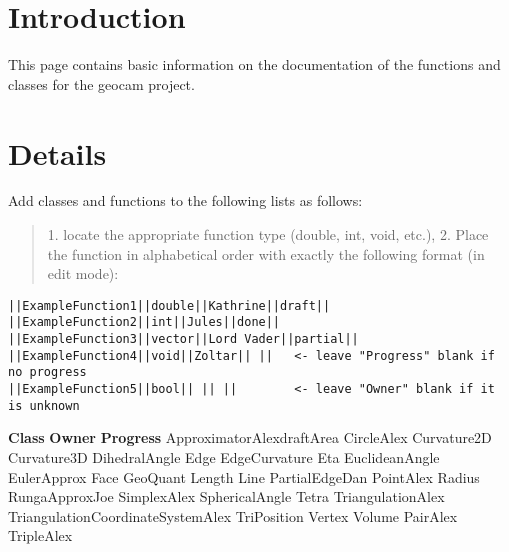 \documentclass[10pt]{article}%
\begin{document}

\section*{Introduction}

\label{f0}This page contains basic information on the documentation of the functions and classes for the geocam project.

\section*{Details}

Add classes and functions to the following lists as follows:
\begin{quotation} 1.  locate the appropriate function type (double, int, void, etc.), 2.  Place the function in alphabetical order with exactly the following format (in edit mode):\end{quotation}{\small{\begin{verbatim} 
||ExampleFunction1||double||Kathrine||draft||
||ExampleFunction2||int||Jules||done||
||ExampleFunction3||vector||Lord Vader||partial||
||ExampleFunction4||void||Zoltar|| ||   <- leave "Progress" blank if no progress
||ExampleFunction5||bool|| || ||        <- leave "Owner" blank if it is unknown
\end{verbatim}
}}
 \textbf{Class}  \textbf{Owner}  \textbf{Progress} ApproximatorAlexdraftArea    CircleAlex Curvature2D  Curvature3D  DihedralAngle  Edge  EdgeCurvature  Eta  EuclideanAngle  EulerApprox  Face  GeoQuant  Length  Line  PartialEdgeDan  PointAlex Radius  RungaApproxJoe  SimplexAlex SphericalAngle  Tetra  TriangulationAlex TriangulationCoordinateSystemAlex TriPosition  Vertex  Volume  PairAlex TripleAlex 
\end{document}
